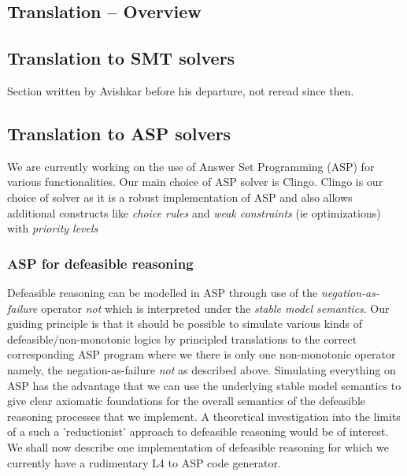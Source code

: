 \subsection{Translation -- Overview}\label{sec:translation_overview}

\subsection{Translation to SMT solvers}\label{sec:translation_smt}


\begin{tcolorbox}[breakable,colback=red!5!white,colframe=red!75!black,
  title=Comments on status]
Section written by Avishkar before his departure, not reread since then.
\end{tcolorbox}

\subsection{Translation to ASP solvers}\label{sec:translation_asp}
We are currently working on the use of Answer Set Programming (ASP) for various functionalities. Our main choice of ASP solver is Clingo. Clingo is our choice of solver as it is a robust implementation of ASP and also allows additional constructs like \emph{choice rules} and \emph{weak constraints} (ie optimizations) with \emph{priority levels}
\subsubsection{ASP for defeasible reasoning}
Defeasible reasoning can be modelled in ASP through use of the \emph{negation-as-failure} operator \emph{not} which is interpreted under the \emph{stable model semantics}. Our guiding principle is that it should be possible to simulate various kinds of defeasible/non-monotonic logics by principled translations to the correct corresponding ASP program where we there is only one non-monotonic operator namely, the negation-as-failure \emph{not} as described above. Simulating everything on ASP has the advantage that we can use the underlying stable model semantics to give clear axiomatic foundations for the overall semantics of the defeasible reasoning processes that we implement. A theoretical investigation into the limits of a such a 'reductionist' approach to defeasible reasoning would be of interest. We shall now describe one implementation of defeasible reasoning for which we currently have a rudimentary L4 to ASP code generator.\\

